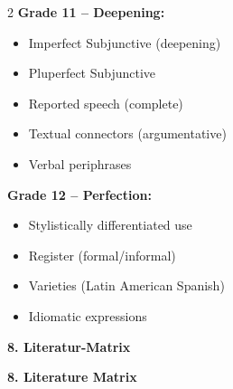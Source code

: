 \documentclass[10pt,a4paper]{article}
\newcommand{\secbil}[2]{%
\vspace{8pt}
\noindent\colorbox{spanisch}{\parbox{0.48\textwidth}{\color{white}\bfseries #1}}%
\hfill%
\colorbox{english}{\parbox{0.48\textwidth}{\color{white}\bfseries #2}}
\vspace{4pt}
}
\begin{document}
\begin{paracol}{2}
\textbf{Grade 11 -- Deepening:}
\begin{itemize}[noitemsep,topsep=2pt]
\item Imperfect Subjunctive (deepening)
\item Pluperfect Subjunctive
\item Reported speech (complete)
\item Textual connectors (argumentative)
\item Verbal periphrases
\end{itemize}

\textbf{Grade 12 -- Perfection:}
\begin{itemize}[noitemsep,topsep=2pt]
\item Stylistically differentiated use
\item Register (formal/informal)
\item Varieties (Latin American Spanish)
\item Idiomatic expressions
\end{itemize}
\end{paracol}

\secbil{8. Literatur-Matrix}{8. Literature Matrix}

\vspace{2mm}
\end{document}
